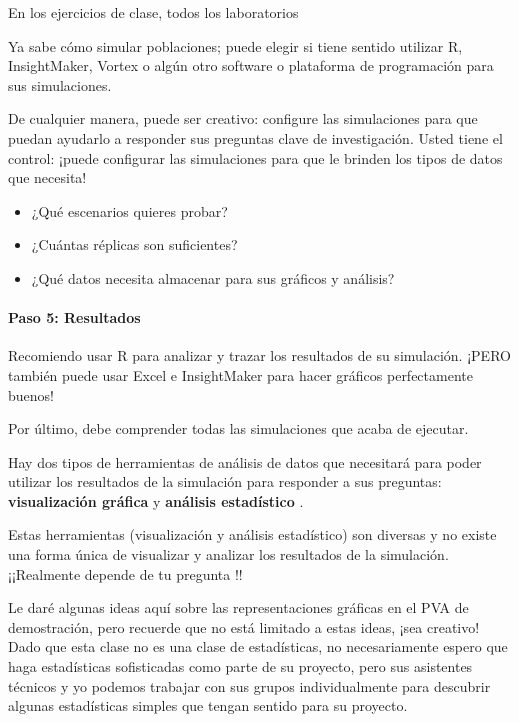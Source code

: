 \documentclass[
]{article}
\providecommand{\tightlist}{%
  \setlength{\itemsep}{0pt}\setlength{\parskip}{0pt}}
\begin{document}
En los ejercicios de clase, todos los laboratorios

Ya sabe cómo simular poblaciones; puede elegir si tiene sentido utilizar
R, InsightMaker, Vortex o algún otro software o plataforma de
programación para sus simulaciones.

De cualquier manera, puede ser creativo: configure las simulaciones para
que puedan ayudarlo a responder sus preguntas clave de investigación.
Usted tiene el control: ¡puede configurar las simulaciones para que le
brinden los tipos de datos que necesita!

\begin{itemize}
\tightlist
\item
  ¿Qué escenarios quieres probar?
\item
  ¿Cuántas réplicas son suficientes?
\item
  ¿Qué datos necesita almacenar para sus gráficos y análisis?
\end{itemize}

\hypertarget{paso-5-resultados}{%
\paragraph{Paso 5: Resultados}\label{paso-5-resultados}}

Recomiendo usar R para analizar y trazar los resultados de su
simulación. ¡PERO también puede usar Excel e InsightMaker para hacer
gráficos perfectamente buenos!

Por último, debe comprender todas las simulaciones que acaba de
ejecutar.

Hay dos tipos de herramientas de análisis de datos que necesitará para
poder utilizar los resultados de la simulación para responder a sus
preguntas: \textbf{visualización gráfica } y \textbf{análisis
estadístico }.

Estas herramientas (visualización y análisis estadístico) son diversas y
no existe una forma única de visualizar y analizar los resultados de la
simulación. ¡¡Realmente depende de tu pregunta !!

Le daré algunas ideas aquí sobre las representaciones gráficas en el PVA
de demostración, pero recuerde que no está limitado a estas ideas, ¡sea
creativo! Dado que esta clase no es una clase de estadísticas, no
necesariamente espero que haga estadísticas sofisticadas como parte de
su proyecto, pero sus asistentes técnicos y yo podemos trabajar con sus
grupos individualmente para descubrir algunas estadísticas simples que
tengan sentido para su proyecto.
\end{document}
